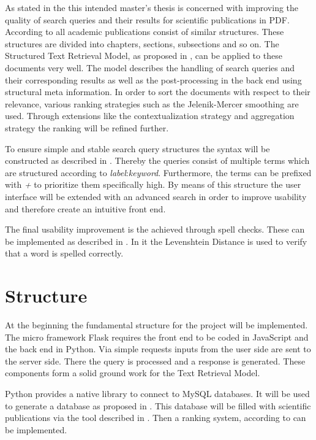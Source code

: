 \documentclass[a4paper, 12pt]{scrartcl}
\begin{document}
As stated in the  this intended master's thesis is concerned with improving the quality of search queries and their results for scientific
publications in PDF. According to \cite{KGJK14} all academic publications consist of similar structures. These structures are divided into chapters,
sections, subsections and so on. The Structured Text Retrieval Model, as proposed in \cite{RNBY99}, can be applied to these documents very well.
The model describes the handling of search queries and their corresponding results as well as the post-processing in the back end using structural meta information. 
In order to sort the documents with respect to their relevance, various ranking strategies such as the Jelenik-Mercer smoothing are used. Through extensions like the 
contextualization strategy and aggregation strategy the ranking will be refined further.

To ensure simple and stable search query structures the syntax will be constructed as described in \cite{Coh03}. Thereby the queries consist of multiple terms
which are structured according to \textit{label}:\textit{keyword}. Furthermore, the terms can be prefixed with \textit{+} to prioritize them specifically high. By means
of this structure the user interface will be extended with an advanced search in order to improve usability and therefore create an intuitive front end.

The final usability improvement is the achieved through spell checks. These can be implemented as described in \cite{SPCB13}. In it the Levenshtein Distance is used to verify 
that a word is spelled correctly.

\section{Structure}

At the beginning the fundamental structure for the project will be implemented. The micro framework Flask requires the front end to be coded in JavaScript and the back end in Python. 
Via simple requests inputs from the user side are sent to the server side. There the query is processed and a response is generated. These components form a solid ground work 
for the Text Retrieval Model.

Python provides a native library to connect to MySQL databases. It will be used to generate a database as proposed in \cite{YA94}. This database will
be filled with scientific publications via the tool described in \cite{KGJK14}. Then a ranking system, according to \cite{MRS08, RNBY99} can be implemented.
\end{document}
